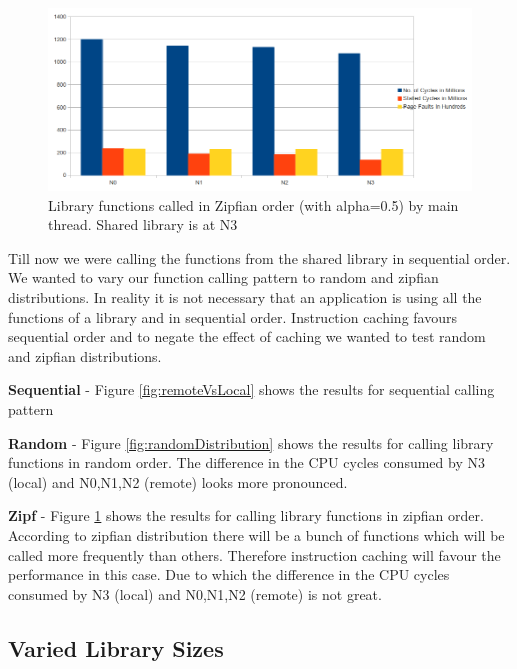 \begin{figure}
    \centering
    \includegraphics[scale=0.35]{zipfDistribution.png}
    \caption{Library functions called in Zipfian order (with alpha=0.5) by main thread. Shared library is at N3 }
    \label{fig:zipfDistribution}
\end{figure}

Till now we were calling the functions from the shared library in sequential order.
We wanted to vary our function calling pattern to random and zipfian distributions.
In reality it is not necessary that an application is using all the functions of a library and in sequential order.
Instruction caching favours sequential order and to negate the effect of caching we wanted to test random and zipfian distributions.

\textbf{Sequential} - Figure \ref{fig:remoteVsLocal} shows the results for sequential calling pattern

\textbf{Random} - Figure \ref{fig:randomDistribution} shows the results for calling library functions in random order.
The difference in the CPU cycles consumed by N3 (local) and N0,N1,N2 (remote) looks more pronounced.

\textbf{Zipf} - Figure \ref{fig:zipfDistribution} shows the results for calling library functions in zipfian order.
According to zipfian distribution there will be a bunch of functions which will be called more frequently than others.
Therefore instruction caching will favour the performance in this case.
Due to which the difference in the CPU cycles consumed by N3 (local) and N0,N1,N2 (remote) is not great.


\subsection{Varied Library Sizes}

